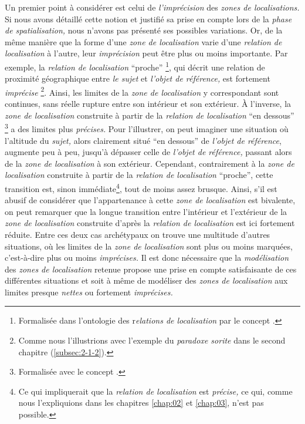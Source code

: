 Un premier point à considérer est celui de \emph{l'imprécision} des
\emph{zones de localisations.} Si nous avons détaillé cette notion et
justifié sa prise en compte lors de la \emph{phase de spatialisation,}
nous n'avons pas présenté ses possibles variations. Or, de la même
manière que la forme d'une \emph{zone de localisation} varie d'une
\emph{relation de localisation} à l'autre, leur \emph{imprécision}
peut être plus ou moins importante. Par exemple, la \emph{relation de
  localisation} \enquote{proche} \footnote{Formalisée dans l'ontologie
  des r\emph{elations de localisation} par le concept
  .}, qui décrit une relation de proximité
géographique entre \emph{le sujet} et \emph{l'objet de référence,} est
fortement \emph{imprécise} \footnote{Comme nous l'illustrions avec
  l'exemple du \emph{paradoxe sorite} dans le second chapitre
  (\autoref{subsec:2-1-2}).}. Ainsi, les limites de la \emph{zone de
  localisation} y correspondant sont continues, sans réelle rupture
entre son intérieur et son extérieur. À l'inverse, la \emph{zone de
  localisation} construite à partir de la \emph{relation de
  localisation} \enquote{en dessous} \footnote{Formalisée avec le
  concept .} a des limites plus
\emph{précises.} Pour l'illustrer, on peut imaginer une situation où
l'altitude du \emph{sujet,} alors clairement situé \enquote{en
  dessous} de \emph{l'objet de référence}, augmente peu à peu, jusqu'à
dépasser celle de \emph{l'objet de référence,} passant alors de la
\emph{zone de localisation} à son extérieur. Cependant, contrairement
à la \emph{zone de localisation} construite à partir de la
\emph{relation de localisation} \enquote{proche}, cette transition
est, sinon immédiate\footnote{Ce qui impliquerait que la
  \emph{relation de localisation} est \emph{précise,} ce qui, comme
  nous l'expliquions dans les chapitres \ref{chap:02} et
  \ref{chap:03}, n'est pas possible.}, tout de moins assez
brusque. Ainsi, s'il est abusif de considérer que l'appartenance à
cette \emph{zone de localisation} est bivalente, on peut remarquer que
la longue transition entre l'intérieur et l'extérieur de la \emph{zone
  de localisation} construite d'après la \emph{relation de
  localisation}  est ici fortement réduite. Entre
ces deux cas archétypaux on trouve une multitude d'autres situations,
où les limites de la \emph{zone de localisation} sont plus ou moins
marquées, c'est-à-dire plus ou moins \emph{imprécises.} Il est donc
nécessaire que la \emph{modélisation} des \emph{zones de localisation}
retenue propose une prise en compte satisfaisante de ces différentes
situations et soit à même de modéliser des \emph{zones de
  localisation} aux limites presque \emph{nettes} ou fortement
\emph{imprécises.}

